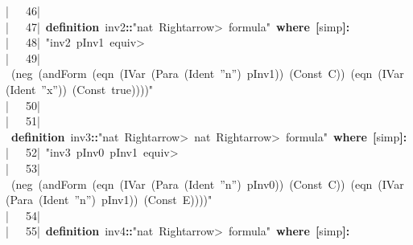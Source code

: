 \documentclass{article}
\newcommand{\syntaxKEYWORDA}[1]{\textcolor[rgb]{0.0,0.4,0.6}{\textbf{#1}}}
\newcommand{\syntaxKEYWORDB}[1]{\textcolor[rgb]{0.0,0.6,0.4}{\textbf{#1}}}
\newcommand{\syntaxLITERALA}[1]{\textcolor[rgb]{1.0,0.0,0.8}{#1}}
\newcommand{\syntaxOPERATOR}[1]{\textcolor[rgb]{0.0,0.0,0.0}{\textbf{#1}}}
\newcommand{\syntaxKEYWORDA}[1]{\textcolor[rgb]{0.0,0.4,0.6}{\textbf{#1}}}
\newcommand{\syntaxKEYWORDB}[1]{\textcolor[rgb]{0.0,0.6,0.4}{\textbf{#1}}}
\newcommand{\syntaxLITERALA}[1]{\textcolor[rgb]{1.0,0.0,0.8}{#1}}
\newcommand{\syntaxOPERATOR}[1]{\textcolor[rgb]{0.0,0.0,0.0}{\textbf{#1}}}
\newcommand{\syntaxKEYWORDA}[1]{\textcolor[rgb]{0.0,0.4,0.6}{\textbf{#1}}}
\newcommand{\syntaxKEYWORDB}[1]{\textcolor[rgb]{0.0,0.6,0.4}{\textbf{#1}}}
\newcommand{\syntaxLITERALA}[1]{\textcolor[rgb]{1.0,0.0,0.8}{#1}}
\newcommand{\syntaxOPERATOR}[1]{\textcolor[rgb]{0.0,0.0,0.0}{\textbf{#1}}}
\newcommand{\syntaxKEYWORDA}[1]{\textcolor[rgb]{0.0,0.4,0.6}{#1}}
\newcommand{\syntaxKEYWORDB}[1]{\textcolor[rgb]{0.0,0.6,0.4}{#1}}
\newcommand{\syntaxLITERALA}[1]{\textcolor[rgb]{1.0,0.0,0.8}{\textbf{#1}}}
\newcommand{\syntaxOPERATOR}[1]{\textcolor[rgb]{0.0,0.0,0.0}{#1}}
\newcommand{\syntaxKEYWORDA}[1]{\textcolor[rgb]{0.0,0.4,0.6}{#1}}
\newcommand{\syntaxKEYWORDB}[1]{\textcolor[rgb]{0.0,0.6,0.4}{#1}}
\newcommand{\syntaxLITERALA}[1]{\textcolor[rgb]{1.0,0.0,0.8}{#1}}
\newcommand{\syntaxOPERATOR}[1]{\textcolor[rgb]{0.0,0.0,0.0}{#1}}
\newcommand{\syntaxKEYWORDA}[1]{\textcolor[rgb]{0.0,0.4,0.6}{\textbf{#1}}}
\newcommand{\syntaxKEYWORDB}[1]{\textcolor[rgb]{0.0,0.6,0.4}{\textbf{#1}}}
\newcommand{\syntaxLITERALA}[1]{\textcolor[rgb]{1.0,0.0,0.8}{#1}}
\newcommand{\syntaxOPERATOR}[1]{\textcolor[rgb]{0.0,0.0,0.0}{\textbf{#1}}}
\newcommand{\gutter}[1]{\textcolor[rgb]{0,0,0}{{|}#1}}
\newcommand{\gutterH}[1]{\textcolor[rgb]{1,0,0}{{|}#1}}
\begin{document}
\gutter{\ \ \ 46{|}\ }\hspace*{\fill}\\
\gutter{\ \ \ 47{|}\ }\syntaxKEYWORDA{definition}{\ }inv\usebox{\underscorebox}\usebox{\underscorebox}2\syntaxOPERATOR{::}\syntaxLITERALA{"nat{\ }\<Rightarrow>{\ }formula"}{\ }\syntaxKEYWORDB{where}{\ }\syntaxOPERATOR{{[}}simp\syntaxOPERATOR{{]}}\syntaxOPERATOR{:}\hspace*{\fill}\\
\gutter{\ \ \ 48{|}\ }\syntaxLITERALA{"inv\usebox{\underscorebox}\usebox{\underscorebox}2{\ }p\usebox{\underscorebox}\usebox{\underscorebox}Inv1{\ }\<equiv>}\hspace*{\fill}\\
\gutter{\ \ \ 49{|}\ }\syntaxLITERALA{(neg{\ }(andForm{\ }(eqn{\ }(IVar{\ }(Para{\ }(Ident{\ }''n''){\ }p\usebox{\underscorebox}\usebox{\underscorebox}Inv1)){\ }(Const{\ }C)){\ }(eqn{\ }(IVar{\ }(Ident{\ }''x'')){\ }(Const{\ }true))))"}\hspace*{\fill}\\
\gutterH{\ \ \ 50{|}\ }\hspace*{\fill}\\
\gutter{\ \ \ 51{|}\ }\syntaxKEYWORDA{definition}{\ }inv\usebox{\underscorebox}\usebox{\underscorebox}3\syntaxOPERATOR{::}\syntaxLITERALA{"nat{\ }\<Rightarrow>{\ }nat{\ }\<Rightarrow>{\ }formula"}{\ }\syntaxKEYWORDB{where}{\ }\syntaxOPERATOR{{[}}simp\syntaxOPERATOR{{]}}\syntaxOPERATOR{:}\hspace*{\fill}\\
\gutter{\ \ \ 52{|}\ }\syntaxLITERALA{"inv\usebox{\underscorebox}\usebox{\underscorebox}3{\ }p\usebox{\underscorebox}\usebox{\underscorebox}Inv0{\ }p\usebox{\underscorebox}\usebox{\underscorebox}Inv1{\ }\<equiv>}\hspace*{\fill}\\
\gutter{\ \ \ 53{|}\ }\syntaxLITERALA{(neg{\ }(andForm{\ }(eqn{\ }(IVar{\ }(Para{\ }(Ident{\ }''n''){\ }p\usebox{\underscorebox}\usebox{\underscorebox}Inv0)){\ }(Const{\ }C)){\ }(eqn{\ }(IVar{\ }(Para{\ }(Ident{\ }''n''){\ }p\usebox{\underscorebox}\usebox{\underscorebox}Inv1)){\ }(Const{\ }E))))"}\hspace*{\fill}\\
\gutter{\ \ \ 54{|}\ }\hspace*{\fill}\\
\gutterH{\ \ \ 55{|}\ }\syntaxKEYWORDA{definition}{\ }inv\usebox{\underscorebox}\usebox{\underscorebox}4\syntaxOPERATOR{::}\syntaxLITERALA{"nat{\ }\<Rightarrow>{\ }formula"}{\ }\syntaxKEYWORDB{where}{\ }\syntaxOPERATOR{{[}}simp\syntaxOPERATOR{{]}}\syntaxOPERATOR{:}\hspace*{\fill}\\
\end{document}
